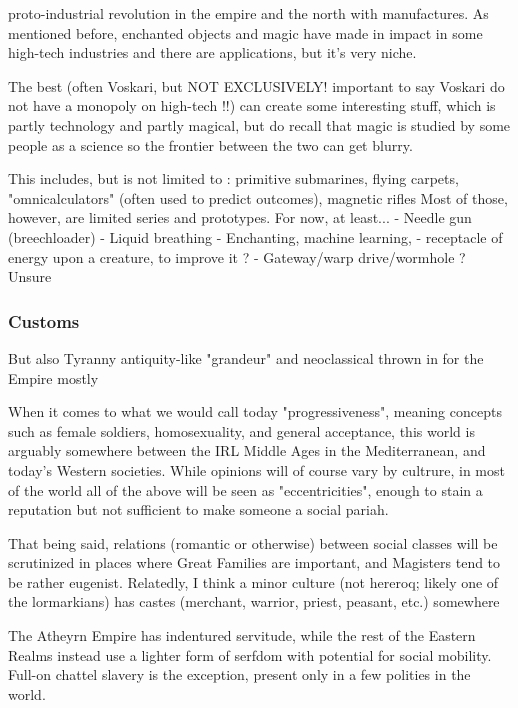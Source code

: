 proto-industrial revolution in the empire and the north with manufactures. As mentioned before, enchanted objects and magic have made in impact in some high-tech industries and there are applications, but it's very niche.

The best (often Voskari, but NOT EXCLUSIVELY! important to say Voskari do not have a monopoly on high-tech !!) can create some interesting stuff, which is partly technology and partly magical, but do recall that magic is studied by some people as a science so the frontier between the two can get blurry.



This includes, but is not limited to : primitive submarines, flying carpets, "omnicalculators" (often used to predict outcomes), magnetic rifles
Most of those, however, are limited series and prototypes. For now, at least...
- Needle gun (breechloader)
- Liquid breathing
- Enchanting, machine learning, 
- receptacle of energy upon a creature, to improve it ?
- Gateway/warp drive/wormhole ? Unsure





\subsubsection{Customs}

But also Tyranny antiquity-like "grandeur" and neoclassical thrown in for the Empire mostly

When it comes to what we would call today "progressiveness", meaning concepts such as female soldiers, homosexuality, and general acceptance, this world is arguably somewhere between the IRL Middle Ages in the Mediterranean, and today's Western societies. While opinions will of course vary by cultrure, in most of the world all of the above will be seen as "eccentricities", enough to stain a reputation but not sufficient to make someone a social pariah.

That being said, relations (romantic or otherwise) between social classes will be scrutinized in places where Great Families are important, and Magisters tend to be rather eugenist. Relatedly, I think a minor culture (not hereroq; likely one of the lormarkians) has castes (merchant, warrior, priest, peasant, etc.) somewhere

The Atheyrn Empire has indentured servitude, while the rest of the Eastern Realms instead use a lighter form of serfdom with potential for social mobility. Full-on chattel slavery is the exception, present only in a few polities in the world.

